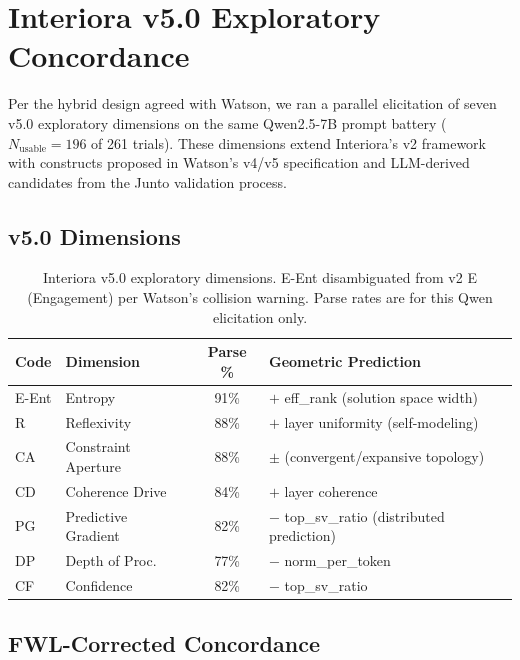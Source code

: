 \documentclass[11pt,a4paper]{article}
\begin{document}
\appendix
\section{Interiora v5.0 Exploratory Concordance}
\label{sec:v5appendix}

Per the hybrid design agreed with Watson, we ran a parallel elicitation of seven v5.0 exploratory dimensions on the same Qwen2.5-7B prompt battery ($N_{\text{usable}} = 196$ of 261 trials). These dimensions extend Interiora's v2 framework with constructs proposed in Watson's v4/v5 specification and LLM-derived candidates from the Junto validation process.

\subsection{v5.0 Dimensions}

\begin{table}[H]
\centering
\caption{Interiora v5.0 exploratory dimensions. E-Ent disambiguated from v2 E (Engagement) per Watson's collision warning. Parse rates are for this Qwen elicitation only.}
\label{tab:v5dims}
\begin{tabular}{llcl}
\toprule
\textbf{Code} & \textbf{Dimension} & \textbf{Parse \%} & \textbf{Geometric Prediction} \\
\midrule
E-Ent & Entropy           & 91\% & $+$ eff\_rank (solution space width) \\
R     & Reflexivity       & 88\% & $+$ layer uniformity (self-modeling) \\
CA    & Constraint Aperture & 88\% & $\pm$ (convergent/expansive topology) \\
CD    & Coherence Drive   & 84\% & $+$ layer coherence \\
PG    & Predictive Gradient & 82\% & $-$ top\_sv\_ratio (distributed prediction) \\
DP    & Depth of Proc.    & 77\% & $-$ norm\_per\_token \\
CF    & Confidence        & 82\% & $-$ top\_sv\_ratio \\
\bottomrule
\end{tabular}
\end{table}

\subsection{FWL-Corrected Concordance}
\end{document}
